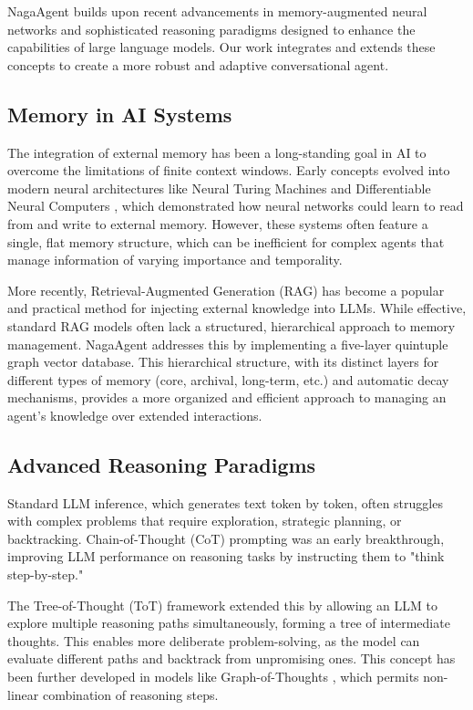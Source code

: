 \documentclass[letterpaper]{article} %
\begin{document}
NagaAgent builds upon recent advancements in memory-augmented neural networks and sophisticated reasoning paradigms designed to enhance the capabilities of large language models. Our work integrates and extends these concepts to create a more robust and adaptive conversational agent.

\subsection{Memory in AI Systems}
The integration of external memory has been a long-standing goal in AI to overcome the limitations of finite context windows. Early concepts evolved into modern neural architectures like Neural Turing Machines \cite{graves2014neural} and Differentiable Neural Computers \cite{graves2016hybrid}, which demonstrated how neural networks could learn to read from and write to external memory. However, these systems often feature a single, flat memory structure, which can be inefficient for complex agents that manage information of varying importance and temporality.

More recently, Retrieval-Augmented Generation (RAG) has become a popular and practical method for injecting external knowledge into LLMs. While effective, standard RAG models often lack a structured, hierarchical approach to memory management. NagaAgent addresses this by implementing a five-layer quintuple graph vector database. This hierarchical structure, with its distinct layers for different types of memory (core, archival, long-term, etc.) and automatic decay mechanisms, provides a more organized and efficient approach to managing an agent's knowledge over extended interactions.

\subsection{Advanced Reasoning Paradigms}
Standard LLM inference, which generates text token by token, often struggles with complex problems that require exploration, strategic planning, or backtracking. Chain-of-Thought (CoT) prompting was an early breakthrough, improving LLM performance on reasoning tasks by instructing them to "think step-by-step."

The Tree-of-Thought (ToT) framework \cite{yao2024tree, long2023large} extended this by allowing an LLM to explore multiple reasoning paths simultaneously, forming a tree of intermediate thoughts. This enables more deliberate problem-solving, as the model can evaluate different paths and backtrack from unpromising ones. This concept has been further developed in models like Graph-of-Thoughts \cite{besta2024graph}, which permits non-linear combination of reasoning steps.
\end{document}
